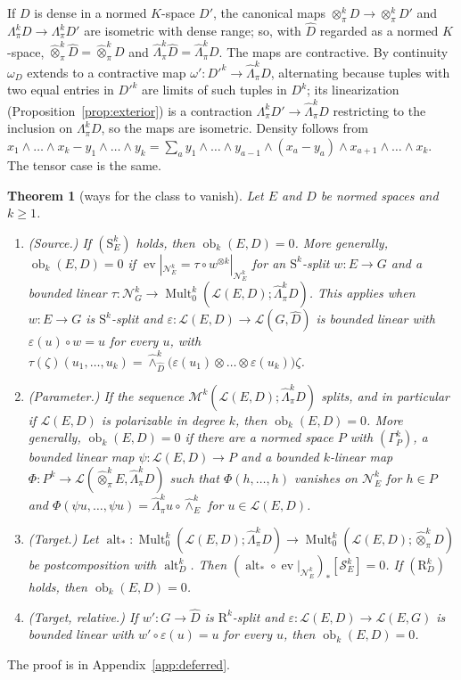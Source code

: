 \documentclass[11pt]{amsart}
\newtheorem{theorem}{Theorem}[section]
\theoremstyle{definition}
\theoremstyle{remark}
\numberwithin{equation}{section}
\newcommand{\cL}{\mathcal L}
\newcommand{\Mult}{\operatorname{Mult}}
\theoremstyle{plain}
\theoremstyle{definition}
\theoremstyle{plain}
\newcommand{\alt}{\operatorname{alt}}
\newcommand{\ev}{\operatorname{ev}}
\newcommand{\ob}{\operatorname{ob}}
\newcommand{\cN}{\mathcal N}
\newcommand{\cS}{\mathcal S}
\newcommand{\cM}{\mathcal M}
\begin{document}
If $D$ is dense in a normed $K$-space $D'$, the canonical maps $\otimes^k_\pi D\to\otimes^k_\pi D'$ and
$\Lambda^k_\pi D\to\Lambda^k_\pi D'$ are isometric with dense range; so, with $\widehat D$ regarded as a normed $K$-space,
$\widehat\otimes^k_\pi\widehat D=\widehat\otimes^k_\pi D$ and $\widehat\Lambda^k_\pi\widehat D=\widehat\Lambda^k_\pi D$.
The maps are contractive. By continuity $\omega_D$ extends to a contractive map $\omega'\colon D'^k\to\widehat\Lambda^k_\pi D$,
alternating because tuples with two equal entries in $D'^k$ are limits of such tuples in $D^k$; its linearization
(Proposition~\ref{prop:exterior}) is a contraction $\Lambda^k_\pi D'\to\widehat\Lambda^k_\pi D$ restricting to the
inclusion on $\Lambda^k_\pi D$, so the maps are isometric. Density follows from
$x_1\wedge\dots\wedge x_k-y_1\wedge\dots\wedge y_k=\sum_ay_1\wedge\dots\wedge y_{a-1}\wedge(x_a-y_a)\wedge x_{a+1}\wedge\dots\wedge x_k$.
The tensor case is the same.

\begin{theorem}[ways for the class to vanish]\label{ob:thm:mechanisms}
Let $E$ and $D$ be normed spaces and $k\ge1$.
\begin{enumerate}
\item \textup{(Source.)} If $(\mathrm S^k_E)$ holds, then $\ob_k(E,D)=0$. More generally, $\ob_k(E,D)=0$ if
$\ev|_{\cN^k_E}=\tau\circ w^{\otimes k}|_{\cN^k_E}$ for an $\mathrm S^k$-split $w\colon E\to G$ and a bounded linear
$\tau\colon\cN^k_G\to\Mult^k_0(\cL(E,D);\widehat\Lambda^k_\pi D)$. This applies when $w\colon E\to G$ is
$\mathrm S^k$-split and $\varepsilon\colon\cL(E,D)\to\cL(G,\widehat D)$ is bounded linear with $\varepsilon(u)\circ w=u$
for every $u$, with
$\tau(\zeta)(u_1,\dots,u_k)=\widehat\wedge^k_{\widehat D}\bigl(\varepsilon(u_1)\otimes\dots\otimes\varepsilon(u_k)\bigr)\zeta$.
\item \textup{(Parameter.)} If the sequence $\cM^k(\cL(E,D);\widehat\Lambda^k_\pi D)$ splits, and in particular if
$\cL(E,D)$ is polarizable in degree $k$, then $\ob_k(E,D)=0$. More generally, $\ob_k(E,D)=0$ if there are a normed space $P$ with $(\Gamma^k_P)$, a
bounded linear map $\psi\colon\cL(E,D)\to P$ and a bounded $k$-linear map
$\Phi\colon P^k\to\cL(\widehat\otimes^k_\pi E,\widehat\Lambda^k_\pi D)$ such that $\Phi(h,\dots,h)$ vanishes on $\cN^k_E$
for $h\in P$ and $\Phi(\psi u,\dots,\psi u)=\widehat\Lambda^k_\pi u\circ\widehat\wedge^k_E$ for $u\in\cL(E,D)$.
\item \textup{(Target.)} Let
$\alt_*\colon\Mult^k_0(\cL(E,D);\widehat\Lambda^k_\pi D)\to\Mult^k_0(\cL(E,D);\widehat\otimes^k_\pi D)$ be
postcomposition with $\alt^k_D$. Then
$(\alt_*\circ\ev|_{\cN^k_E})_*[\cS^k_E]=0$. If $(\mathrm R^k_D)$ holds, then $\ob_k(E,D)=0$.
\item[(3$'$)] \textup{(Target, relative.)} If $w'\colon G\to\widehat D$ is $\mathrm R^k$-split and
$\varepsilon\colon\cL(E,D)\to\cL(E,G)$ is bounded linear with $w'\circ\varepsilon(u)=u$ for every $u$, then
$\ob_k(E,D)=0$.
\end{enumerate}
\end{theorem}
The proof is in Appendix~\ref{app:deferred}.
\end{document}
